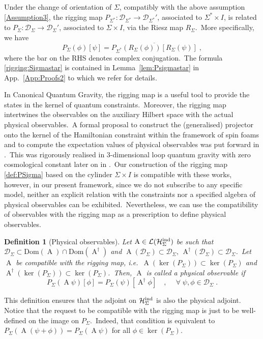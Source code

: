 \documentclass[11pt]{article}
\newcommand{\be}{\begin{equation}}
\newcommand{\ee}{\end{equation}}
\newcommand{\cD}{\mathcal{D}}
\newcommand{\Hind}{\mathcal{H}_{\Sigma}^{\rm ind}}
\newtheorem{definition}{Definition}[section]
\theoremstyle{definition}
\numberwithin{equation}{section}
\begin{document}
Under the change of orientation of $\Sigma$, compatibly with the above assumption \ref{Assumption3}, the rigging map $P_{\Sigma^*}:\cD_{\Sigma^*}\to\cD_{\Sigma^*}'$, associated to $\Sigma^*\times I$, is related to $P_{\Sigma}:\cD_{\Sigma}\to\cD_{\Sigma}'$, associated to $\Sigma\times I$, via the Riesz map $R_{\Sigma}$.~More specifically, we have
\be\label{rigging:Sigmastar}
P_{\Sigma}(\phi)[\psi]=\overline{P_{\Sigma^*}\left(R_{\Sigma}(\phi)\right)\left[R_{\Sigma}(\psi)\right]}\;,
\ee
where the bar on the RHS denotes complex conjugation.~The formula \eqref{rigging:Sigmastar} is contained in Lemma~\ref{lem:Psigmastar} in App.~\ref{App:Proofs2} to which we refer for details.

In Canonical Quantum Gravity, the rigging map is a useful tool to provide the states in the kernel of quantum constraints.~Moreover, the rigging map intertwines the observables on the auxiliary Hilbert space with the actual physical observables.~A formal proposal to construct the (generalised) projector onto the kernel of the Hamiltonian constraint within the framework of spin foams and to compute the expectation values of physical observables was put forward in \cite{Rovelli:1998dx}.~This was rigorously realised in 3-dimensional loop quantum gravity with zero cosmological constant later on in \cite{Noui_Perez_2005}.~Our construction of the rigging map \eqref{def:PSigma} based on the cylinder $\Sigma\times I$ is compatible with these works, however, in our present framework, since we do not subscribe to any specific model, neither an explicit relation with the constraints nor a specified algebra of physical observables can be exhibited.~Nevertheless, we can use the compatibility of observables with the rigging map as a prescription to define physical observables.
\begin{definition}[Physical observables]
    Let $\operatorname{A}\in \mathcal{L}(\Hind)$ be such that $\cD_{\Sigma}\subset\mathrm{Dom}(\operatorname{A})\cap\mathrm{Dom}(\operatorname{A}^{\dagger})$ and $\operatorname{A}(\cD_{\Sigma})\subset\cD_{\Sigma},\,\operatorname{A}^{\dagger}(\cD_{\Sigma})\subset\cD_{\Sigma}$.~Let $\operatorname{A}$ be compatible with the rigging map, i.e.~$\operatorname{A}(\ker(P_{\Sigma}))\subset\ker(P_{\Sigma})$ and $\operatorname{A}^{\dagger}(\ker(P_{\Sigma}))\subset\ker(P_{\Sigma})$.~Then, $\operatorname{A}$ is called a \emph{physical observable} if \[P_{\Sigma}(\operatorname{A}\psi)[\phi]=P_{\Sigma}(\psi)[\operatorname{A}^\dagger\phi]\quad,\quad\  \forall\;\psi,\phi\in\cD_{\Sigma}\;.\]
\end{definition}
This definition ensures that the adjoint on $\Hind$ is also the physical adjoint. Notice that the request to be compatible with the rigging map is just to be well-defined on the image on $P_{\Sigma}$.~Indeed, that condition is equivalent to $P_{\Sigma}(\operatorname{A}(\psi+\phi))=P_{\Sigma}(\operatorname{A}\psi)$ for all $\phi\in\ker(P_{\Sigma})$.
\end{document}
